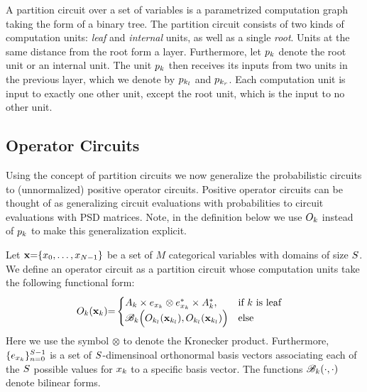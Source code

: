 \begin{definition}
	\label{def:partition_circuit}
	A partition circuit over a set of variables is a parametrized computation graph taking the form of a binary tree. The partition circuit consists of two kinds of computation units:
	\textit{leaf} and \textit{internal} units, as well as a single \textit{root}.
	Units at the same distance from the root form a layer.
	Furthermore, let $p_k$ denote the root unit or an internal unit. The unit $p_k$ then receives its inputs from two units in the previous layer, which we denote by $p_{k_l}$ and $p_{k_r}$. Each computation unit is input to exactly one other unit, except the root unit, which is the input to no other unit.
\end{definition}

\subsection{Operator Circuits}

Using the concept of partition circuits we now generalize the probabilistic circuits to (unnormalized) positive operator circuits. Positive operator circuits can be thought of as generalizing circuit evaluations with probabilities to circuit evaluations with PSD matrices. Note, in the definition below we use $O_k$ instead of $p_k$ to make this generalization explicit.
\begin{definition}
	\label{def:poc}
	Let   $\mathbf{x}{=}\{x_0,\dots ,x_{N{-}1}  \}$ be a set of $M$ categorical variables with domains of size $S$.
	We define an operator circuit as a partition circuit whose computation units take the following functional form:
	\begin{align}
		 & {O}_k(\mathbf{x}_k){=}
		\begin{cases}
			A_{k} \times  e_{x_k} \otimes  e^*_{x_k} \times A_{k}^*,
			 & \text{if $k$ is leaf}
			\\
			\mathscr{B}_k \Bigl(O_{k_l}(\mathbf{x}_{k_l}), O_{k_l}(\mathbf{x}_{k_l}) \Bigr)
			 & \text{else}
		\end{cases}
		\label{eq:poc:def}
	\end{align}
	Here we use the symbol $\otimes$ to denote the Kronecker product.
	Furthermore, $\{e_{x_k} \}_{n=0}^{S-1}$ is a set of $S$-dimensinoal orthonormal basis vectors associating each of the $S$ possible values for $x_k$ to a specific basis vector. The functions $\mathscr{B}_k(\cdot, \cdot)$ denote bilinear forms.
\end{definition}



